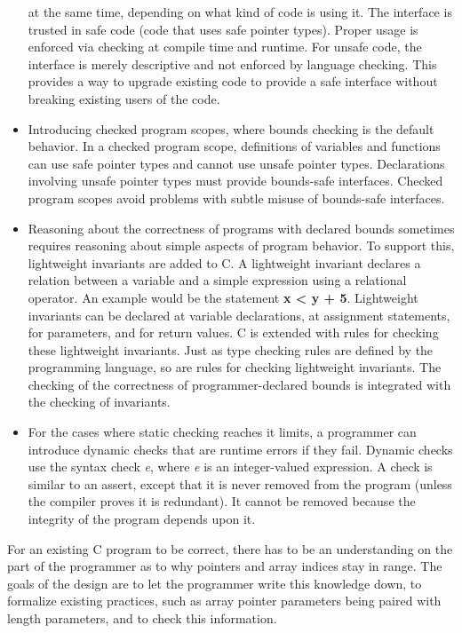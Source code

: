 \documentclass[]{article}
\begin{document}
\begin{itemize}
  at the same time, depending on what kind of code is using it. The
  interface is trusted in safe code (code that uses safe pointer types).
  Proper usage is enforced via checking at compile time and runtime. For
  unsafe code, the interface is merely descriptive and not enforced by
  language checking. This provides a way to upgrade existing code to
  provide a safe interface without breaking existing users of the code.
\item
  Introducing checked program scopes, where bounds checking is the
  default behavior. In a checked program scope, definitions of variables
  and functions can use safe pointer types and cannot use unsafe pointer
  types. Declarations involving unsafe pointer types must provide
  bounds-safe interfaces. Checked program scopes avoid problems with
  subtle misuse of bounds-safe interfaces.
\item
  Reasoning about the correctness of programs with declared bounds
  sometimes requires reasoning about simple aspects of program behavior.
  To support this, lightweight invariants are added to C. A lightweight
  invariant declares a relation between a variable and a simple
  expression using a relational operator. An example would be the
  statement \textbf{x \textless{} y + 5}. Lightweight invariants can be
  declared at variable declarations, at assignment statements, for
  parameters, and for return values. C is extended with rules for
  checking these lightweight invariants. Just as type checking rules are
  defined by the programming language, so are rules for checking
  lightweight invariants. The checking of the correctness of
  programmer-declared bounds is integrated with the checking of
  invariants.
\item
  For the cases where static checking reaches it limits, a programmer
  can introduce dynamic checks that are runtime errors if they fail.
  Dynamic checks use the syntax check \emph{e}, where \emph{e} is an
  integer-valued expression. A check is similar to an assert, except
  that it is never removed from the program (unless the compiler proves
  it is redundant). It cannot be removed because the integrity of the
  program depends upon it.
\end{itemize}

For an existing C program to be correct, there has to be an
understanding on the part of the programmer as to why pointers and array
indices stay in range. The goals of the design are to let the programmer
write this knowledge down, to formalize existing practices, such as
array pointer parameters being paired with length parameters, and to
check this information.
\end{document}
